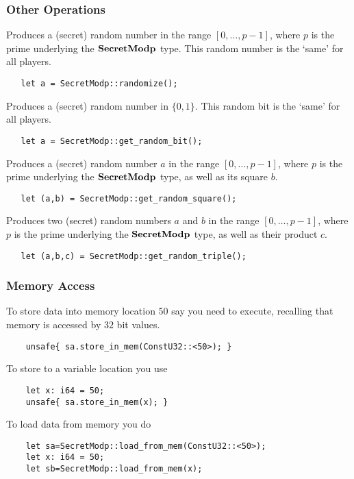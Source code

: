 \subsubsection{Other Operations}

Produces a (secret) random number in the range $[0,\ldots,p-1]$,
where $p$ is the prime underlying the $\mathbf{SecretModp}$ type.
This random number is the `same' for all players.
\begin{lstlisting}
   let a = SecretModp::randomize();
\end{lstlisting}

Produces a (secret) random number in $\{0,1\}$.
This random bit is the `same' for all players.
\begin{lstlisting}
   let a = SecretModp::get_random_bit();
\end{lstlisting}

Produces a (secret) random number $a$ in the range $[0,\ldots,p-1]$,
where $p$ is the prime underlying the $\mathbf{SecretModp}$ type,
as well as its square $b$.
\begin{lstlisting}
   let (a,b) = SecretModp::get_random_square();
\end{lstlisting}

Produces two (secret) random numbers $a$ and $b$ in the range $[0,\ldots,p-1]$,
where $p$ is the prime underlying the $\mathbf{SecretModp}$ type,
as well as their product $c$.
\begin{lstlisting}
   let (a,b,c) = SecretModp::get_random_triple();
\end{lstlisting}

\subsubsection{Memory Access}
To store data into memory location $50$ say you need to execute,
recalling that memory is accessed by $32$ bit values.
\begin{lstlisting}
    unsafe{ sa.store_in_mem(ConstU32::<50>); }
\end{lstlisting}
To store to a variable location you use
\begin{lstlisting}
    let x: i64 = 50;
    unsafe{ sa.store_in_mem(x); }
\end{lstlisting}

To load data from memory you do
\begin{lstlisting}
    let sa=SecretModp::load_from_mem(ConstU32::<50>);
    let x: i64 = 50;
    let sb=SecretModp::load_from_mem(x);
\end{lstlisting}


